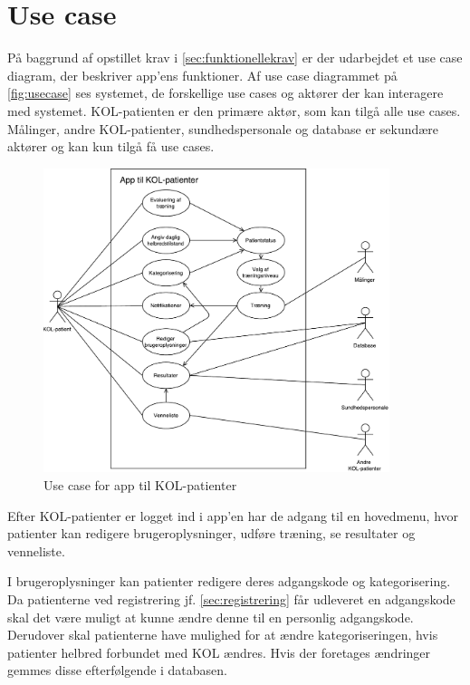 \section{Use case} \label{sec:usecase} 
På baggrund af opstillet krav i \autoref{sec:funktionellekrav} er der udarbejdet et use case diagram, der beskriver app'ens funktioner. Af use case diagrammet på \autoref{fig:usecase} ses systemet, de forskellige use cases og aktører der kan interagere med systemet. KOL-patienten er den primære aktør, som kan tilgå alle use cases. Målinger, andre KOL-patienter, sundhedspersonale og database er sekundære aktører og kan kun tilgå få use cases. 

\begin{figure} [H]
\centering
\includegraphics[width=0.9\textwidth]{figures/aktivitetsdiagram/Usecase}
\caption{Use case for app til KOL-patienter}
\label{fig:usecase}
\end{figure}

\noindent
Efter KOL-patienter er logget ind i app'en har de adgang til en hovedmenu, hvor patienter kan redigere brugeroplysninger, udføre træning, se resultater og venneliste. 

I brugeroplysninger kan patienter redigere deres adgangskode og kategorisering. Da patienterne ved registrering jf. \autoref{sec:registrering} får udleveret en adgangskode skal det være muligt at kunne ændre denne til en personlig adgangskode. Derudover skal patienterne have mulighed for at ændre kategoriseringen, hvis patienter helbred forbundet med KOL ændres. Hvis der foretages ændringer gemmes disse efterfølgende i databasen. 

